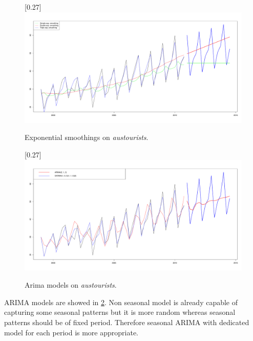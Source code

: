     \begin{figure}[H]
        \begin{center}
            \scalebox{0.255}[0.27]{\includegraphics{img/exp-smoothings.pdf}}
            \caption{Exponential smoothings on \emph{austourists}.}
            \label{img:exp-smoothings}
        \end{center}
    \end{figure}

    \begin{figure}[H]
        \begin{center}
            \scalebox{0.255}[0.27]{\includegraphics{img/arima-sarima.pdf}}
            \caption{Arima models on \emph{austourists}.}
            \label{img:arimas}
        \end{center}
    \end{figure}


    ARIMA models are showed in \ref{img:arimas}. Non seasonal model is already capable of capturing some seasonal
    patterns but it is more random whereas seasonal patterns should be of fixed period. Therefore seasonal ARIMA with
    dedicated model for each period is more appropriate.

